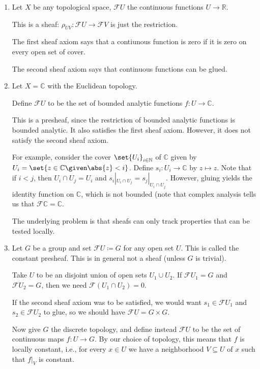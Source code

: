 \begin{enumerate}
	\item Let  $X$ be any topological space, $\mathcal{F}U$ the continuous functions $U\to \mathbb{R}$.

		This is a sheaf: $\rho_{UV}\colon \mathcal{F}U\to \mathcal{F}V$ is just the restriction.

		The first sheaf axiom says that a contiunous function is zero if it is zero on every open set
		of cover.

		The second sheaf axiom says that continuous functions can be glued.

	\item Let $X = \mathbb{C}$ with the Euclidean topology.

		Define $\mathcal{F}U$ to be the set of bounded analytic functions $f\colon U\to \mathbb{C}$.

		This is a presheaf, since the restriction of bounded analytic functions is
		bounded analytic. It also satisfies the first sheaf axiom. However, it does not
		satisfy the second sheaf axiom.

		For example, consider the cover $\set{U_i}_{i \in \mathbb{N}}$ of $\mathbb{C}$ given
		by $U_i = \set{z \in \mathbb{C}\given \abs{z}<i}$. Define $s_i\colon U_i\to \mathbb{C}$
		by $z\mapsto z$. Note that if $i < j$, then $U_i\cap U_j = U_i$ and
		$s_i|_{U_i\cap U_j} = s_j|_{U_i\cap U_j}$. However, gluing yields the identity
		function on $\mathbb{C}$, which is not bounded (note that complex analysis tells
		us that $\mathcal{F}\mathbb{C} = \mathbb{C}$.

		The underlying problem is that sheafs can only track properties that can be tested
		locally.

	\item Let $G$ be a group and set $\mathcal{F}U \coloneqq G$ for any open set $U$.
		This is called the constant presheaf. This is in general not a sheaf (unless $G$ is trivial).

		Take $U$ to be an disjoint union of open sets $U_1 \cup U_2$. If $\mathcal{F}U_1 = G$ and
		$\mathcal{F}U_2 = G$, then we need $\mathcal{F}(U_1\cap U_2) = 0$.

		If the second sheaf axiom was to be satisfied, we would want $s_1 \in \mathcal{F}U_1$ and
		$s_2 \in \mathcal{F}U_2$ to glue, so we should have $\mathcal{F}U = G\times G$.

		Now give $G$ the discrete topology, and define instead $\mathcal{F}U$ to be the set
		of continuous maps $f\colon U\to G$. By our choice of topology, this means that $f$
		is locally constant, i.e., for every $x \in U$ we have a neighborhood $V\subseteq U$ of $x$
		such that  $f|_V$ is constant.


\end{enumerate}
